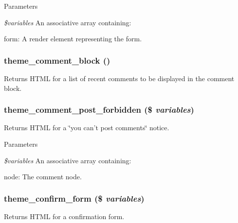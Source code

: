 \begin{DoxyParams}{Parameters}
\item[{\em \$variables}]An associative array containing:
\begin{DoxyItemize}
\item form: A render element representing the form. 
\end{DoxyItemize}\end{DoxyParams}
\hypertarget{group__themeable_gaa980a6cc6eeb012e7255fe0351a332ba}{
\subsubsection[{theme\_\-comment\_\-block}]{\setlength{\rightskip}{0pt plus 5cm}theme\_\-comment\_\-block ()}}
\label{group__themeable_gaa980a6cc6eeb012e7255fe0351a332ba}
Returns HTML for a list of recent comments to be displayed in the comment block. \hypertarget{group__themeable_ga161f469ee8e0de3c126729f154863a11}{
\subsubsection[{theme\_\-comment\_\-post\_\-forbidden}]{\setlength{\rightskip}{0pt plus 5cm}theme\_\-comment\_\-post\_\-forbidden (\$ {\em variables})}}
\label{group__themeable_ga161f469ee8e0de3c126729f154863a11}
Returns HTML for a \char`\"{}you can't post comments\char`\"{} notice.


\begin{DoxyParams}{Parameters}
\item[{\em \$variables}]An associative array containing:
\begin{DoxyItemize}
\item node: The comment node. 
\end{DoxyItemize}\end{DoxyParams}
\hypertarget{group__themeable_ga21630d5749786400d03449b295f9a31d}{
\subsubsection[{theme\_\-confirm\_\-form}]{\setlength{\rightskip}{0pt plus 5cm}theme\_\-confirm\_\-form (\$ {\em variables})}}
\label{group__themeable_ga21630d5749786400d03449b295f9a31d}
Returns HTML for a confirmation form.

